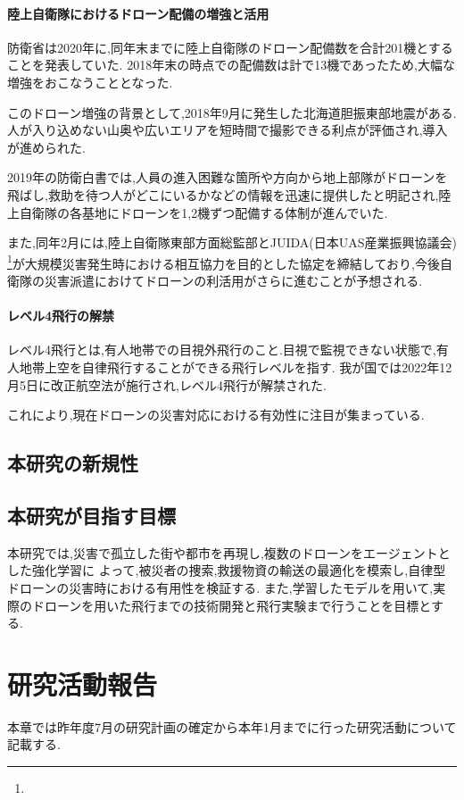 \documentclass{article}[jsarticle]
\begin{document}
\paragraph{陸上自衛隊におけるドローン配備の増強と活用}
防衛省は2020年に,同年末までに陸上自衛隊のドローン配備数を合計201機とすることを発表していた.
2018年末の時点での配備数は計で13機であったため,大幅な増強をおこなうこととなった.\par
このドローン増強の背景として,2018年9月に発生した北海道胆振東部地震がある.人が入り込めない山奥や広いエリアを短時間で撮影できる利点が評価され,導入が進められた.\par
2019年の防衛白書では,人員の進入困難な箇所や方向から地上部隊がドローンを飛ばし,救助を待つ人がどこにいるかなどの情報を迅速に提供したと明記され,陸上自衛隊の各基地にドローンを1,2機ずつ配備する体制が進んでいた.\par
また,同年2月には,陸上自衛隊東部方面総監部とJUIDA(日本UAS産業振興協議会)
\footnote{}が大規模災害発生時における相互協力を目的とした協定を締結しており,今後自衛隊の災害派遣におけてドローンの利活用がさらに進むことが予想される.
\paragraph{レベル4飛行の解禁} \par
レベル4飛行とは,有人地帯での目視外飛行のこと.目視で監視できない状態で,有人地帯上空を自律飛行することができる飛行レベルを指す.
我が国では2022年12月5日に改正航空法が施行され,レベル4飛行が解禁された.\par 
これにより,現在ドローンの災害対応における有効性に注目が集まっている.

\subsection{本研究の新規性}

\subsection{本研究が目指す目標}
本研究では,災害で孤立した街や都市を再現し,複数のドローンをエージェントとした強化学習に
よって,被災者の捜索,救援物資の輸送の最適化を模索し,自律型ドローンの災害時における有用性を検証する. 
また,学習したモデルを用いて,実際のドローンを用いた飛行までの技術開発と飛行実験まで行うことを目標とする.

\section{研究活動報告}
本章では昨年度7月の研究計画の確定から本年1月までに行った研究活動について記載する.
\end{document}
